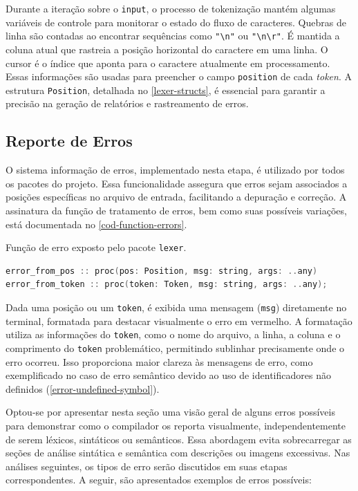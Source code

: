 Durante a iteração sobre o \texttt{input}, o processo de tokenização mantém algumas variáveis de controle para monitorar o estado do fluxo de caracteres. Quebras de linha são contadas ao encontrar sequências como \verb|"\n"| ou \verb|"\n\r"|. É mantida a coluna atual que rastreia a posição horizontal do caractere em uma linha. O cursor é o índice que aponta para o caractere atualmente em processamento. Essas informações são usadas para preencher o campo \texttt{position} de cada \textit{token}. A estrutura \texttt{Position}, detalhada no \autoref{lexer-structs}, é essencial para garantir a precisão na geração de relatórios e rastreamento de erros.

\subsection{Reporte de Erros} \label{subsection-erros}

O sistema informação de erros, implementado nesta etapa, é utilizado por todos os pacotes do projeto. Essa funcionalidade assegura que erros sejam associados a posições específicas no arquivo de entrada, facilitando a depuração e correção. A assinatura da função de tratamento de erros, bem como suas possíveis variações, está documentada no \autoref{cod-function-errors}.

\begin{codigo}[H]
    \caption{\small Função de erro exposto pelo pacote \texttt{lexer}. }
        \label{cod-function-errors}
\begin{lstlisting}[language=C++]
error_from_pos :: proc(pos: Position, msg: string, args: ..any)
error_from_token :: proc(token: Token, msg: string, args: ..any);
\end{lstlisting}
\end{codigo}


Dada uma posição ou um \texttt{token}, é exibida uma mensagem (\texttt{msg}) diretamente no terminal, formatada para destacar visualmente o erro em vermelho. A formatação utiliza as informações do \texttt{token}, como o nome do arquivo, a linha, a coluna e o comprimento do \texttt{token} problemático, permitindo sublinhar precisamente onde o erro ocorreu. Isso proporciona maior clareza às mensagens de erro, como exemplificado no caso de erro semântico devido ao uso de identificadores não definidos (\autoref{error-undefined-symbol}).

Optou-se por apresentar nesta seção uma visão geral de alguns erros possíveis para demonstrar como o compilador os reporta visualmente, independentemente de serem léxicos, sintáticos ou semânticos. Essa abordagem evita sobrecarregar as seções de análise sintática e semântica com descrições ou imagens excessivas. Nas análises seguintes, os tipos de erro serão discutidos em suas etapas correspondentes. A seguir, são apresentados exemplos de erros possíveis:

